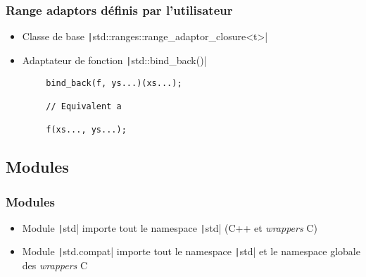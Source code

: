 \documentclass[C++.tex]{subfiles}
\begin{document}
\begin{frame}[fragile]
	\frametitle{Range adaptors définis par l'utilisateur}
	\begin{itemize}
		\item Classe de base \texttt|std::ranges::range_adaptor_closure<t>|
		\item Adaptateur de fonction \texttt|std::bind_back()|
	\end{itemize}

	\begin{verbatim}
		bind_back(f, ys...)(xs...);

		// Equivalent a

		f(xs..., ys...);
	\end{verbatim}

\end{frame}

\subsection*{Modules}
\begin{frame}[fragile]
	\frametitle{Modules}
	\begin{itemize}
		\item Module \texttt|std| importe tout le namespace \texttt|std| (C++ et \textit{wrappers} C)
		\item Module \texttt|std.compat| importe tout le namespace \texttt|std| et le namespace globale des \textit{wrappers} C
	\end{itemize}

\end{frame}
\end{document}
